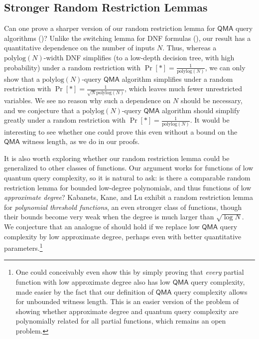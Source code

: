 \documentclass[11pt]{article}%
\newcommand{\polylog}{\mathrm{polylog}}
\begin{document}
\subsection{Stronger Random Restriction Lemmas}
Can one prove a sharper version of our random restriction lemma for $\mathsf{QMA}$ query algorithms ()? Unlike the switching lemma for DNF formulas (), our result has a quantitative dependence on the number of inputs $N$. Thus, whereas a $\polylog(N)$-width DNF simplifies (to a low-depth decision tree, with high probability) under a random restriction with $\Pr[*] = \frac{1}{\polylog(N)}$, we can only show that a $\polylog(N)$-query $\mathsf{QMA}$ algorithm simplifies under a random restriction with $\Pr[*] = \frac{1}{\sqrt{N}\polylog(N)}$, which leaves much fewer unrestricted variables. We see no reason why such a dependence on $N$ should be necessary, and we conjecture that a $\polylog(N)$-query $\mathsf{QMA}$ algorithm should simplify greatly under a random restriction with $\Pr[*] = \frac{1}{\polylog(N)}$. It would be interesting to see whether one could prove this even without a bound on the $\mathsf{QMA}$ witness length, as we do in our proofs.

It is also worth exploring whether our random restriction lemma could be generalized to other classes of functions. Our argument works for functions of low quantum query complexity, so it is natural to ask: is there a comparable random restriction lemma for bounded low-degree polynomials, and thus functions of low \textit{approximate degree}? Kabanets, Kane, and Lu \cite{KKL17} exhibit a random restriction lemma for \textit{polynomial threshold functions}, an even stronger class of functions, though their bounds become very weak when the degree is much larger than $\sqrt{\log N}$. We conjecture that an analogue of  should hold if we replace low $\mathsf{QMA}$ query complexity by low approximate degree, perhaps even with better quantitative parameters.\footnote{One could conceivably even show this by simply proving that \textit{every} partial function with low approximate degree also has low $\mathsf{QMA}$ query complexity, made easier by the fact that our definition of $\mathsf{QMA}$ query complexity allows for unbounded witness length. This is an easier version of the problem of showing whether approximate degree and quantum query complexity are polynomially related for all partial functions, which remains an open problem.}
\end{document}
